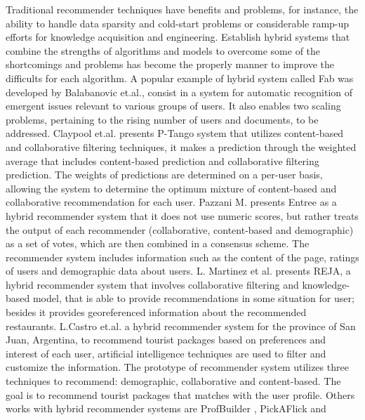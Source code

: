 Traditional recommender techniques have benefits and problems, for
instance, the ability to handle data sparsity and cold-start problems
or considerable ramp-up efforts for knowledge acquisition and
engineering. Establish hybrid systems that combine the strengths of
algorithms and models to overcome some of the shortcomings and
problems has become the properly manner to improve the difficults for
each algorithm.
A popular example of hybrid system called Fab was developed by 
Balabanovic et.al.\cite{balabanovic1997fab}, consist in a system 
for automatic recognition of emergent issues relevant to various 
groups of users. It also enables two scaling problems, 
pertaining to the rising number of users and documents, to be addressed. 
Claypool et.al.\cite{claypool1999combining} 
presents P-Tango system that utilizes content-based and collaborative
filtering techniques, it makes a prediction through the weighted
average that includes content-based prediction and collaborative
filtering prediction. The weights of predictions are determined on a
per-user basis, allowing the system to determine the optimum mixture
of content-based and collaborative recommendation for each user.
Pazzani M.\cite{pazzani1999framework} presents Entree as a hybrid
recommender system that it does not use numeric scores, but rather
treats the output of each recommender (collaborative, content-based
and demographic) as a set of votes, which are then combined in a
consensus scheme. The recommender system includes information such as
the content of the page, ratings of users and demographic data about
users. 
L. Martinez et al.\cite{martinez2009reja} presents REJA, a hybrid
recommender system that involves collaborative filtering and
knowledge-based model, that is able to provide recommendations in some
situation for user; besides it provides georeferenced information
about the recommended restaurants.
L.Castro et.al.\cite{castro2012prototype} 
a hybrid recommender system for the province of San Juan, Argentina, 
to recommend tourist packages  based on preferences and interest 
of each user, artificial intelligence
techniques are used to filter and customize the information. The
prototype of recommender system utilizes three techniques to
recommend: demographic, collaborative and content-based. The goal is
to recommend tourist packages that matches with the user profile.
Others works with hybrid recommender systems are ProfBuilder
\cite{al1999semantic}, PickAFlick\cite{burke1999integrating}  and

